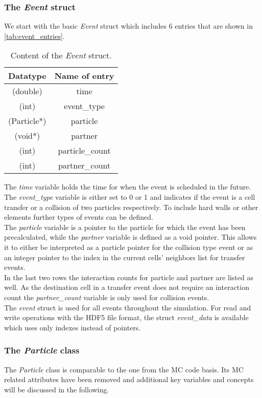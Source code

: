 \subsubsection{The \textit{Event} struct}
\label{sec:event_struct}
We start with the basic \textit{Event} struct which includes 6 entries that are shown in \autoref{tab:event_entries}.
\begin{table}[h!]
\centering
\begin{tabular}{c|c}
\textbf{Datatype} & \textbf{Name of entry}\\ \hline
(double) & time \\
(int) & event\_type \\
(Particle*)  & particle \\
(void*) & partner \\
(int) & particle\_count \\
(int) & partner\_count \\
\end{tabular}
\caption[Event struct content]{Content of the \textit{Event} struct.}
\label{tab:event_entries}
\end{table}
The \textit{time} variable holds the time for when the event is scheduled in the future. The \textit{event\_type} variable is either set to 0 or 1 and indicates if the event is a cell transfer or a collision of two particles respectively. To include hard walls or other elements further types of events can be defined.\\
The \textit{particle} variable is a pointer to the particle for which the event has been precalculated, while the \textit{partner} variable is defined as a void pointer. This allows it to either be interpreted as a particle pointer for the collision type event or as an integer pointer to the index in the current cells' neighbors list for transfer events.\\
In the last two rows the interaction counts for particle and partner are listed as well. As the destination cell in a transfer event does not require an interaction count the \textit{partner\_count} variable is only used for collision events.\\

The \textit{event} struct is used for all events throughout the simulation. For read and write operations with the HDF5 file format, the struct \textit{event\_data} is available which uses only indexes instead of pointers.

\subsubsection{The \textit{Particle} class}
\label{sec:particle_class}
The \textit{Particle} class is comparable to the one from the MC code basis. Its MC related attributes have been removed and additional key variables and concepts will be discussed in the following.\\

